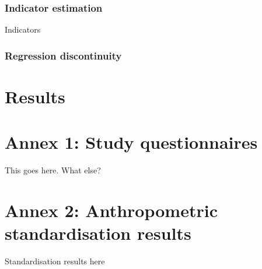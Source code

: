 \documentclass[12pt,a4paper]{article}
\begin{document}
\hypertarget{indicator-estimation}{%
\subsubsection{Indicator estimation}\label{indicator-estimation}}

Indicators

\hypertarget{regression-discontinuity}{%
\subsubsection{Regression discontinuity}\label{regression-discontinuity}}

\newpage

\hypertarget{results}{%
\section{Results}\label{results}}

\newpage

\hypertarget{annex-1-study-questionnaires}{%
\section*{Annex 1: Study questionnaires}\label{annex-1-study-questionnaires}}

This goes here. What else?

\newpage

\hypertarget{annex-2-anthropometric-standardisation-results}{%
\section*{Annex 2: Anthropometric standardisation results}\label{annex-2-anthropometric-standardisation-results}}

Standardisation results here

\newpage

\renewcommand\refname{References}

\end{document}
